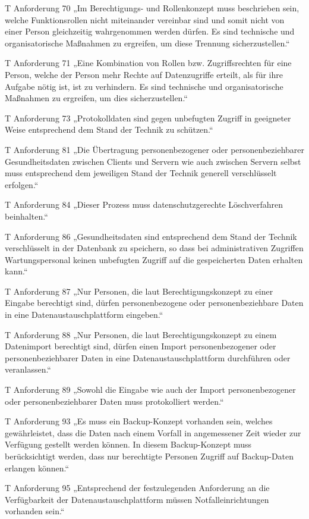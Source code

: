 T Anforderung 70
„Im Berechtigungs- und Rollenkonzept muss beschrieben sein, welche Funktionsrollen nicht miteinander vereinbar sind und somit nicht von einer Person gleichzeitig wahrgenommen werden dürfen. Es sind technische und organisatorische Maßnahmen zu ergreifen, um diese Trennung sicherzustellen.“

T Anforderung 71
„Eine Kombination von Rollen bzw. Zugriffsrechten für eine Person, welche der Person mehr Rechte auf Datenzugriffe erteilt, als für ihre Aufgabe nötig ist, ist zu verhindern. Es sind technische und organisatorische Maßnahmen zu ergreifen, um dies sicherzustellen.“

T Anforderung 73
„Protokolldaten sind gegen unbefugten Zugriff in geeigneter Weise entsprechend dem Stand der Technik zu schützen.“

T Anforderung 81
„Die Übertragung personenbezogener oder personenbeziehbarer Gesundheitsdaten zwischen Clients und Servern wie auch zwischen Servern selbst muss entsprechend dem jeweiligen Stand der Technik generell verschlüsselt erfolgen.“

T Anforderung 84
„Dieser Prozess muss datenschutzgerechte Löschverfahren beinhalten.“

T Anforderung 86
„Gesundheitsdaten sind entsprechend dem Stand der Technik verschlüsselt in der Datenbank zu speichern, so dass bei administrativen Zugriffen Wartungspersonal keinen unbefugten Zugriff auf die gespeicherten Daten erhalten kann.“

T Anforderung 87
„Nur Personen, die laut Berechtigungskonzept zu einer Eingabe berechtigt sind, dürfen personenbezogene oder personenbeziehbare Daten in eine Datenaustauschplattform eingeben.“

T Anforderung 88
„Nur Personen, die laut Berechtigungskonzept zu einem Datenimport berechtigt sind, dürfen einen Import personenbezogener oder personenbeziehbarer Daten in eine Datenaustauschplattform durchführen oder veranlassen.“

T Anforderung 89
„Sowohl die Eingabe wie auch der Import personenbezogener oder personenbeziehbarer Daten muss protokolliert werden.“

T Anforderung 93
„Es muss ein Backup-Konzept vorhanden sein, welches gewährleistet, dass die Daten nach einem Vorfall in angemessener Zeit wieder zur Verfügung gestellt werden können. In diesem Backup-Konzept muss berücksichtigt werden, dass nur berechtigte Personen Zugriff auf Backup-Daten erlangen können.“

T Anforderung 95
„Entsprechend der festzulegenden Anforderung an die Verfügbarkeit der Datenaustauschplattform müssen Notfalleinrichtungen vorhanden sein.“


